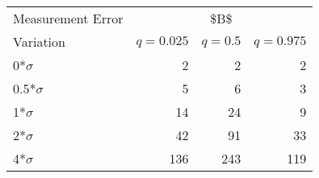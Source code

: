 
\begin{tabular}{lrrr}
\toprule
\multicolumn{1}{c}{Measurement Error} & \multicolumn{3}{c}{\$B\$} \\
Variation & $q = 0.025$ & $q = 0.5$ & $q = 0.975$\\
\midrule
0*$\sigma$ & 2 & 2 & 2\\
0.5*$\sigma$ & 5 & 6 & 3\\
1*$\sigma$ & 14 & 24 & 9\\
2*$\sigma$ & 42 & 91 & 33\\
4*$\sigma$ & 136 & 243 & 119\\
\bottomrule
\end{tabular}
